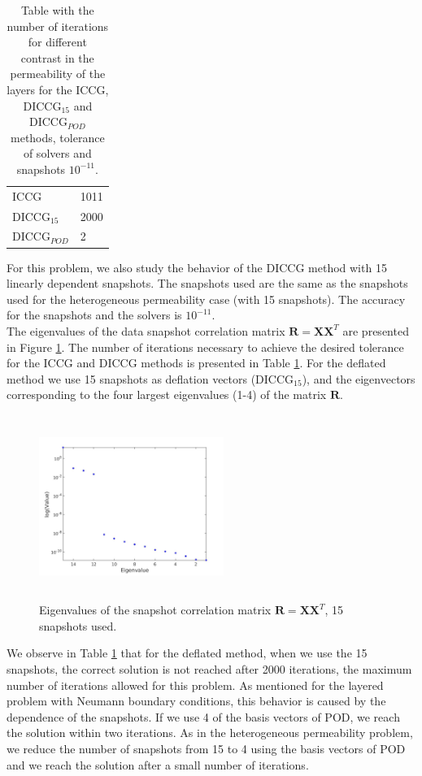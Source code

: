 \documentclass{ecmorXV}
\begin{document}
\begin{table}[!ht]
\centering
\begin{tabular}{ |p{2.5cm}|p{1.5cm}|} 

 \hline
  ICCG  & 1011\\ 
  DICCG$_{15}$  & 2000 \\ 
  DICCG$_{POD}$ & 2\\
 \hline
\end{tabular}
\caption{Table with the number of iterations for different contrast in the permeability of the layers
for the ICCG, DICCG$_{15}$ and DICCG$_{POD}$ methods, tolerance of solvers and snapshots $10^{-11}$. }
\label{table:POD15spe}
\end{table}  

For this problem, we also study the behavior of the DICCG method with 15 linearly dependent snapshots. 
The snapshots used are the same as the snapshots used for the heterogeneous 
permeability case (with 15 snapshots). The accuracy for the snapshots and the solvers is $10^{-11}$.\\
The eigenvalues of the data snapshot correlation matrix $\mathbf{R}=\mathbf{X}\mathbf{X}^T$ are presented
in Figure \ref{fig:eigspe}. The number of iterations necessary to achieve the desired tolerance 
for the ICCG and DICCG methods is presented
in Table \ref{table:POD15spe}. For the deflated method we use 15 snapshots as deflation vectors (DICCG$_{15}$), and 
the eigenvectors corresponding to the four largest eigenvalues (1-4) of the matrix $\mathbf{R}$.\\
\begin{figure}[!h]
 \centering
\includegraphics[width=6cm,height=6cm,keepaspectratio]
{eig_pod_spe.jpg}
\caption{Eigenvalues of the snapshot correlation matrix $\mathbf{R}=\mathbf{X}\mathbf{X}^T$, 15 snapshots used.}
\label{fig:eigspe}
\end{figure}  
We observe in Table \ref{table:POD15spe} that for the deflated method, when we use the 15 snapshots, the 
correct solution is not reached after 2000 iterations, the maximum number of iterations allowed for this problem. 
As mentioned for the layered problem with Neumann boundary conditions, this behavior is caused by the 
dependence of the snapshots. If we use 4 
of the basis vectors of POD, we reach the 
solution within two iterations. As in the heterogeneous permeability problem, we reduce the number of snapshots from 15 to 4 using 
the basis vectors of POD and we reach the solution after a small number of iterations.  
 
\end{document}
